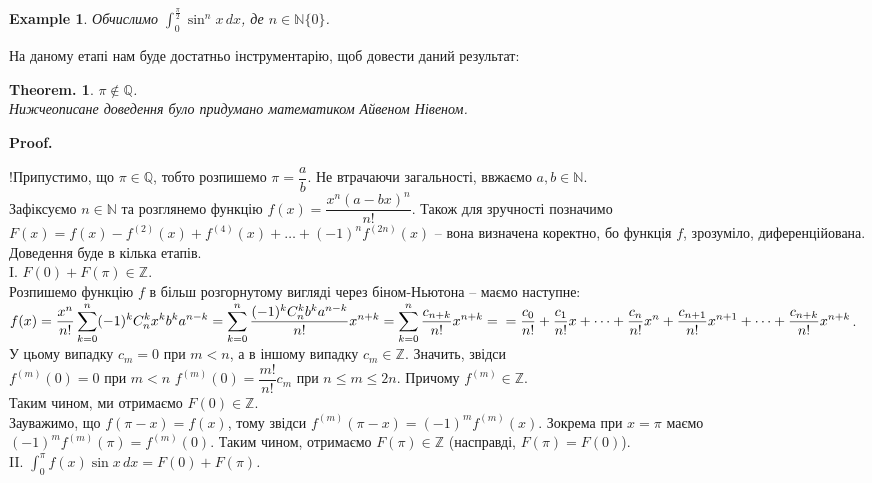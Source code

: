 \documentclass[a4paper, 10pt]{article}
\makeatletter
\def\huge{\displaystyle}
\theoremstyle{theoremdd}
\theoremstyle{theoremdd}
\newtheorem*{theorem*}{Theorem.}
\theoremstyle{theoremdd}
\theoremstyle{theoremdd}
\theoremstyle{theoremdd}
\newtheorem{example}[theorem]{Example}
\theoremstyle{theoremdd}
\theoremstyle{theoremdd}
\theoremstyle{theoremdd}
\theoremstyle{theoremdd}
\renewenvironment{proof}[1][Proof.\\]{\par
\pushQED{\hfill \qed}%
\normalfont \topsep6\p@\@plus6\p@\relax
\trivlist
\item\relax
{\bfseries
#1\@addpunct{.}}\hspace\labelsep\ignorespaces
}{%
\popQED\endtrivlist\@endpefalse
}
\makeatother
\begin{document}
\begin{example}
Обчислимо $\huge\int_0^{\frac{\pi}{2}} \sin^n x\,dx$, де $n \in \mathbb{N} \{0\}$.
\end{example}
\fi
\newpage

На даному етапі нам буде достатньо інструментарію, щоб довести даний результат:
\begin{theorem*}
$\pi \notin \mathbb{Q}$.\\
\textit{Нижчеописане доведення було придумано математиком Айвеном Нівеном.}
\end{theorem*}

\begin{proof}
!Припустимо, що $\pi \in \mathbb{Q}$, тобто розпишемо $\pi = \dfrac{a}{b}$. Не втрачаючи загальності, ввжаємо $a,b \in \mathbb{N}$.\\
Зафіксуємо $n \in \mathbb{N}$ та розглянемо функцію $f(x) = \dfrac{x^n (a-bx)^n}{n!}$. Також для зручності позначимо $F(x) = f(x) - f^{(2)}(x) + f^{(4)}(x) + \dots + (-1)^{n} f^{(2n)}(x)$ -- вона визначена коректно, бо функція $f$, зрозуміло, диференційована. Доведення буде в кілька етапів.
\bigskip \\
I. \textit{$F(0)+F(\pi) \in \mathbb{Z}$}.\\
Розпишемо функцію $f$ в більш розгорнутому вигляді через біном-Ньютона -- маємо наступне:\\
$f(x) = \dfrac{x^n}{n!} \displaystyle\sum_{k=0}^n (-1)^k C_n^k x^k b^k a^{n-k} = \sum_{k=0}^n \dfrac{(-1)^k C_n^k b^k a^{n-k}}{n!} x^{n+k} = \sum_{k=0}^n \dfrac{c_{n+k}}{n!}x^{n+k} = \\
= \dfrac{c_0}{n!} + \dfrac{c_1}{n!}x + \dots + \dfrac{c_n}{n!}x^n + \dfrac{c_{n+1}}{n!}x^{n+1} + \dots + \dfrac{c_{n+k}}{n!}x^{n+k}$.\\
У цьому випадку $c_m = 0$ при $m < n$, а в іншому випадку $c_m \in \mathbb{Z}$. Значить, звідси\\
$f^{(m)}(0) = 0$ при $m < n$ \qquad $f^{(m)}(0) = \dfrac{m!}{n!} c_m$ при $n \leq m \leq 2n$. Причому $f^{(m)} \in \mathbb{Z}$.\\
Таким чином, ми отримаємо $F(0) \in \mathbb{Z}$.\\
Зауважимо, що $f(\pi - x) = f(x)$, тому звідси $f^{(m)}(\pi-x) = (-1)^m f^{(m)}(x)$. Зокрема при $x = \pi$ маємо $(-1)^m f^{(m)}(\pi) = f^{(m)}(0)$. Таким чином, отримаємо $F(\pi) \in \mathbb{Z}$ (насправді, $F(\pi) = F(0)$).
\bigskip \\
II. \textit{$\displaystyle\int_0^{\pi} f(x)\sin x\,dx = F(0) + F(\pi)$.}\\

\end{proof}
\end{document}
